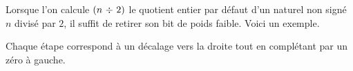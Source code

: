 Lorsque l'on calcule $(n\, \operatorname{\operatorname{\div}}{} \, 2)$ le quotient entier par défaut d'un naturel non signé $n$ divisé par $2$, il suffit de retirer son bit de poids faible. Voici un exemple.


\medskip


\medskip


\medskip


\medskip


\medskip


Chaque étape correspond à un décalage vers la droite tout en complétant par un zéro à gauche.